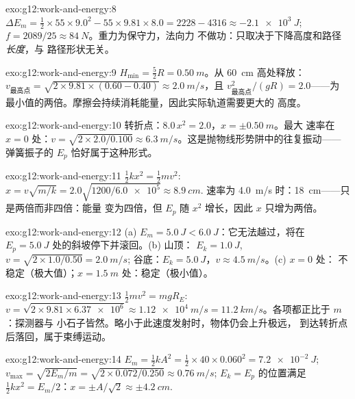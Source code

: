 \begin{solution}{exo:g12:work-and-energy:8}
$\Delta E_m = \tfrac12 \times 55 \times 9.0^2 - 55 \times 9.81 \times
8.0 = 2228 - 4316 \approx \qty{-2.1e3}{J}$;
$f = 2089/25 \approx \qty{84}{N}$。重力为保守力，法向力
不做功：只取决于下降高度和路径\emph{长度}，与
路径形状无关。
\end{solution}

\begin{solution}{exo:g12:work-and-energy:9}
$H_{\min} = \tfrac52 R = \qty{0.50}{m}$。从 \qty{60}{cm} 高处释放：
$v_{\text{最高点}} = \sqrt{2 \times 9.81 \times (0.60 - 0.40)} \approx
\qty{2.0}{m/s}$，且 $v_{\text{最高点}}^2/(gR) = 2.0$——为
最小值的两倍。摩擦会持续消耗能量，因此实际轨道需要更大的
高度。
\end{solution}

\begin{solution}{exo:g12:work-and-energy:10}
转折点：$8.0\,x^2 = 2.0$，$x = \pm\qty{0.50}{m}$。最大
速率在 $x = 0$ 处：$v = \sqrt{2 \times 2.0/0.100} \approx
\qty{6.3}{m/s}$。这是抛物线形势阱中的往复振动——
弹簧振子的 $E_p$ 恰好属于这种形式。
\end{solution}

\begin{solution}{exo:g12:work-and-energy:11}
$\tfrac12 kx^2 = \tfrac12 mv^2$:
$x = v\sqrt{m/k} = 2.0\sqrt{1200/\num{6.0e5}} \approx \qty{8.9}{cm}$.
速率为 \qty{4.0}{m/s} 时：\qty{18}{cm}——只是两倍而非四倍：能量
变为四倍，但 $E_p$ 随 $x^2$ 增长，因此 $x$ 只增为两倍。
\end{solution}

\begin{solution}{exo:g12:work-and-energy:12}
(a) $E_m = \qty{5.0}{J} < \qty{6.0}{J}$：它无法越过，将在
$E_p = \qty{5.0}{J}$ 处的斜坡停下并滚回。(b) 山顶：
$E_k = \qty{1.0}{J}$, $v = \sqrt{2 \times 1.0/0.50} = \qty{2.0}{m/s}$;
谷底：$E_k = \qty{5.0}{J}$，$v \approx \qty{4.5}{m/s}$。(c) $x = 0$ 处：
不稳定（极大值）；$x = \qty{1.5}{m}$ 处：稳定（极小值）。
\end{solution}

\begin{solution}{exo:g12:work-and-energy:13}
$\tfrac12 mv^2 = mgR_E$:
$v = \sqrt{2 \times 9.81 \times \num{6.37e6}} \approx \qty{1.12e4}{m/s}
= \qty{11.2}{km/s}$。各项都正比于 $m$：探测器与
小石子皆然。略小于此速度发射时，物体仍会上升极远，
到达转折点后落回，属于束缚运动。
\end{solution}

\begin{solution}{exo:g12:work-and-energy:14}
$E_m = \tfrac12 kA^2 = \tfrac12 \times 40 \times 0.060^2 =
\qty{7.2e-2}{J}$; $v_{\max} = \sqrt{2E_m/m} =
\sqrt{2 \times 0.072/0.250} \approx \qty{0.76}{m/s}$;
$E_k = E_p$ 的位置满足 $\tfrac12 kx^2 = E_m/2$：$x = \pm A/\sqrt 2 \approx
\pm\qty{4.2}{cm}$.
\end{solution}

